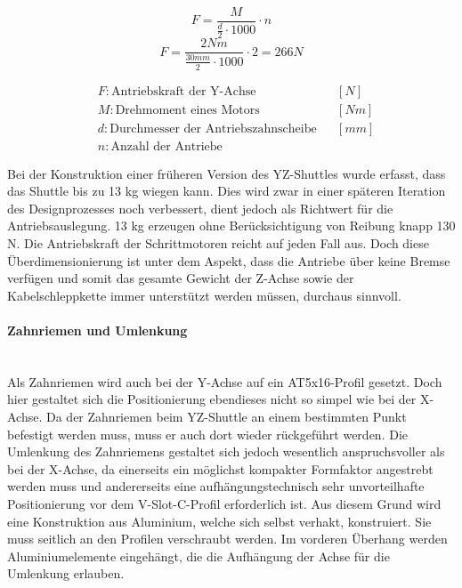 \vspace{5mm}
\noindent\begin{minipage}{\textwidth}
\begin{minipage}[t]{0.5\textwidth}
    \begin{equation*}
        F = \frac{M}{\frac{d}{2} \cdot 1000} \cdot n
    \end{equation*}
    \begin{equation*}
        F = \frac{2 \unit{Nm}}{\frac{30 \unit{mm}}{2} \cdot 1000} \cdot 2 = 266 \unit{N}
    \end{equation*}
\end{minipage}%
\begin{minipage}[t]{0.4\textwidth}
    \vspace*{-5mm}
    \begin{align*}
        &F: \text{Antriebskraft der Y-Achse} & &\left[N\right]\\
        &M: \text{Drehmoment eines Motors} & &\left[Nm\right]\\
        &d: \text{Durchmesser der Antriebszahnscheibe} & &\left[mm\right]\\
        &n: \text{Anzahl der Antriebe} & &
    \end{align*}
\end{minipage}
\end{minipage}

\vspace{5mm}

Bei der Konstruktion einer früheren Version des YZ-Shuttles wurde erfasst, dass das Shuttle bis zu 13 kg wiegen kann. Dies wird zwar in einer späteren Iteration des Designprozesses noch verbessert, dient jedoch als Richtwert für die Antriebsauslegung. 13 kg erzeugen ohne Berücksichtigung von Reibung knapp 130 N. Die Antriebskraft der Schrittmotoren reicht auf jeden Fall aus. Doch diese Überdimensionierung ist unter dem Aspekt, dass die Antriebe über keine Bremse verfügen und somit das gesamte Gewicht der Z-Achse sowie der Kabelschleppkette immer unterstützt werden müssen, durchaus sinnvoll.

\paragraph{Zahnriemen und Umlenkung}\mbox{}\\
Als Zahnriemen wird auch bei der Y-Achse auf ein AT5x16-Profil gesetzt. Doch hier gestaltet sich die Positionierung ebendieses nicht so simpel wie bei der X-Achse. Da der Zahnriemen beim YZ-Shuttle an einem bestimmten Punkt befestigt werden muss, muss er auch dort wieder rückgeführt werden. Die Umlenkung des Zahnriemens gestaltet sich jedoch wesentlich anspruchsvoller als bei der X-Achse, da einerseits ein möglichst kompakter Formfaktor angestrebt werden muss und andererseits eine aufhängungstechnisch sehr unvorteilhafte Positionierung vor dem V-Slot-C-Profil erforderlich ist. Aus diesem Grund wird eine Konstruktion aus Aluminium, welche sich selbst verhakt, konstruiert. Sie muss seitlich an den Profilen verschraubt werden. Im vorderen Überhang werden Aluminiumelemente eingehängt, die die Aufhängung der Achse für die Umlenkung erlauben.

